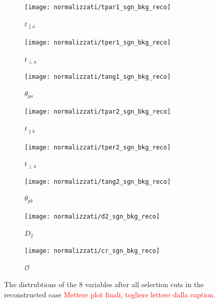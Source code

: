 \documentclass[10pt,a4paper]{book}
\newcommand\todo[1]{\textcolor{red}{#1}}
\begin{document}
\begin{figure}
\begin{subfigure}{.33\textwidth}
\centering
\texttt{[image: normalizzati/tpar1\_sgn\_bkg\_reco]}
\caption{$t_{\parallel a}$}
\end{subfigure}
\begin{subfigure}{0.33\textwidth}
\centering
\texttt{[image: normalizzati/tper1\_sgn\_bkg\_reco]}
\caption{$t_{\perp a}$}
\end{subfigure}
\begin{subfigure}{.33\textwidth}
\centering
\texttt{[image: normalizzati/tang1\_sgn\_bkg\_reco]}
\caption{$\theta_{pa}$}
\end{subfigure}
\begin{subfigure}{.33\textwidth}
\centering
\texttt{[image: normalizzati/tpar2\_sgn\_bkg\_reco]}
\caption{$t_{\parallel b}$}
\end{subfigure}
\begin{subfigure}{0.33\textwidth}
\centering
\texttt{[image: normalizzati/tper2\_sgn\_bkg\_reco]}
\caption{$t_{\perp b}$}
\end{subfigure}
\begin{subfigure}{.33\textwidth}
\centering
\texttt{[image: normalizzati/tang2\_sgn\_bkg\_reco]}
\caption{$\theta_{pb}$}
\end{subfigure}
\begin{subfigure}{0.5\textwidth}
\centering
\texttt{[image: normalizzati/d2\_sgn\_bkg\_reco]}
\caption{$D_2$}
\end{subfigure}
\begin{subfigure}{.5\textwidth}
\centering
\texttt{[image: normalizzati/cr\_sgn\_bkg\_reco]}
\caption{$\mathcal{O}$}
\end{subfigure}
\caption{The distrubtions of the 8 variables after all selection cuts in the reconstructed case \todo{Mettere plot finali, togliere lettere dalla caption}.}
\label{sgn/bkg reco}
\end{figure}
\end{document}
